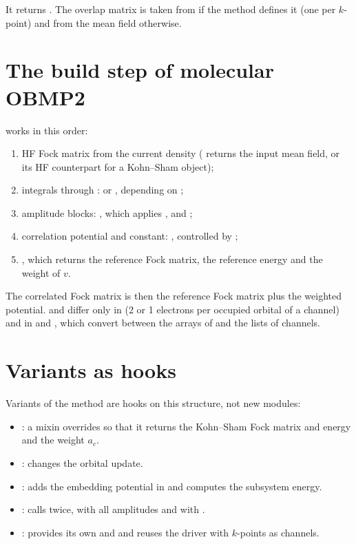 It returns .
The overlap matrix is taken from  if the method defines
it (one per $k$-point) and from the mean field otherwise.

\section{The build step of molecular OBMP2}

 works in this order:

\begin{enumerate}
  \item HF Fock matrix from the current density ( returns the
        input mean field, or its HF counterpart for a Kohn--Sham object);
  \item integrals through :  or
        , depending on ;
  \item amplitude blocks: , which applies
        ,  and ;
  \item correlation potential and constant:
        , controlled by ;
  \item {}, which returns the
        reference Fock matrix, the reference energy and the weight of $v$.
\end{enumerate}

The correlated Fock matrix is then the reference Fock matrix plus the weighted
potential.  and  differ only in  (2 or
1 electrons per occupied orbital of a channel) and in  and
, which convert between the arrays of \pyscf{} and the lists of
channels.

\section{Variants as hooks}

Variants of the method are hooks on this structure, not new modules:

\begin{itemize}
  \item {}: a mixin overrides  so that
        it returns the Kohn--Sham Fock matrix and energy and the weight
        $a_c$.
  \item {}: changes the orbital update.
  \item {}: adds the embedding potential in
         and computes the subsystem energy.
  \item {}: calls 
        twice, with all amplitudes and with .
  \item {}: provides its own  and
         and reuses the driver with $k$-points as channels.
\end{itemize}

